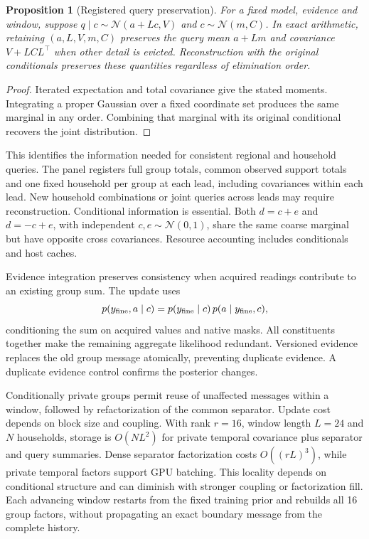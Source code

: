 \documentclass[conference]{IEEEtran}
\newtheorem{proposition}{Proposition}
\begin{document}
\begin{proposition}[Registered query preservation]
For a fixed model, evidence and window, suppose
$q\mid c\sim\mathcal N(a+Lc,V)$ and $c\sim\mathcal N(m,C)$. In exact arithmetic, retaining $(a,L,V,m,C)$ preserves the query mean $a+Lm$ and covariance $V+LCL^\top$ when other detail is evicted. Reconstruction with the original conditionals preserves these quantities regardless of elimination order.
\end{proposition}
\begin{proof}
Iterated expectation and total covariance give the stated moments. Integrating a proper Gaussian over a fixed coordinate set produces the same marginal in any order. Combining that marginal with its original conditional recovers the joint distribution.
\end{proof}

This identifies the information needed for consistent regional and household queries. The panel registers full group totals, common observed support totals and one fixed household per group at each lead, including covariances within each lead. New household combinations or joint queries across leads may require reconstruction. Conditional information is essential. Both $d=c+e$ and $d=-c+e$, with independent $c,e\sim\mathcal N(0,1)$, share the same coarse marginal but have opposite cross covariances. Resource accounting includes conditionals and host caches.

Evidence integration preserves consistency when acquired readings contribute to an existing group sum. The update uses
\begin{equation}
p(y_{\rm fine},a\mid c)
=p(y_{\rm fine}\mid c)\,p(a\mid y_{\rm fine},c),\label{eq:replace}
\end{equation}
conditioning the sum on acquired values and native masks. All constituents together make the remaining aggregate likelihood redundant. Versioned evidence replaces the old group message atomically, preventing duplicate evidence. A duplicate evidence control confirms the posterior changes.

Conditionally private groups permit reuse of unaffected messages within a window, followed by refactorization of the common separator. Update cost depends on block size and coupling. With rank $r=16$, window length $L=24$ and $N$ households, storage is $O(NL^2)$ for private temporal covariance plus separator and query summaries. Dense separator factorization costs $O((rL)^3)$, while private temporal factors support GPU batching. This locality depends on conditional structure and can diminish with stronger coupling or factorization fill. Each advancing window restarts from the fixed training prior and rebuilds all 16 group factors, without propagating an exact boundary message from the complete history.
\end{document}
